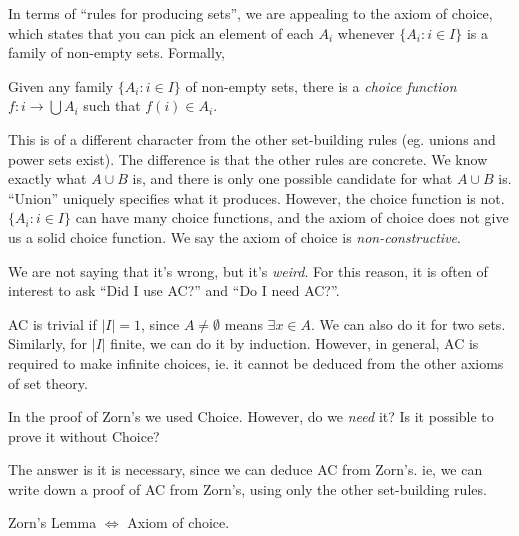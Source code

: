\documentclass[a4paper]{article}
\begin{document}
In terms of ``rules for producing sets'', we are appealing to the axiom of choice, which states that you can pick an element of each $A_i$ whenever $\{A_i: i\in I\}$ is a family of non-empty sets. Formally,
\begin{axiom}
  Given any family $\{A_i: i\in I\}$ of non-empty sets, there is a \emph{choice function} $f: i \to \bigcup A_i$ such that $f(i)\in A_i$.
\end{axiom}
This is of a different character from the other set-building rules (eg. unions and power sets exist). The difference is that the other rules are concrete. We know exactly what $A\cup B$ is, and there is only one possible candidate for what $A\cup B$ is. ``Union'' uniquely specifies what it produces. However, the choice function is not. $\{A_i:i\in I\}$ can have many choice functions, and the axiom of choice does not give us a solid choice function. We say the axiom of choice is \emph{non-constructive}.

We are not saying that it's wrong, but it's \emph{weird}. For this reason, it is often of interest to ask ``Did I use AC?'' and ``Do I need AC?''.

\note AC is trivial if $|I| = 1$, since $A\not=\emptyset$ means $\exists x\in A$. We can also do it for two sets. Similarly, for $|I|$ finite, we can do it by induction. However, in general, AC is required to make infinite choices, ie. it cannot be deduced from the other axioms of set theory.

In the proof of Zorn's we used Choice. However, do we \emph{need} it? Is it possible to prove it without Choice?

The answer is it is necessary, since we can deduce AC from Zorn's. ie, we can write down a proof of AC from Zorn's, using only the other set-building rules.

\begin{thm}
  Zorn's Lemma $\Leftrightarrow$ Axiom of choice.
\end{thm}
\end{document}
